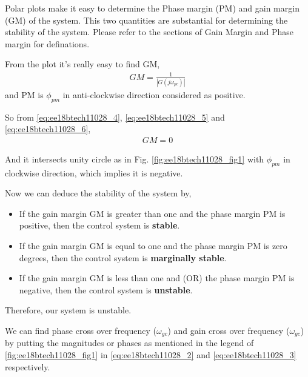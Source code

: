 \begin{enumerate}[label=\thesection.\arabic*.,ref=\thesection.\theenumi]
Polar plots make it easy to determine the Phase margin (PM) and gain margin (GM) of the system.
This two quantities are substantial for determining the stability of the system.
Please refer to the sections of Gain Margin and Phase margin for definations.




From the plot it's really easy to find GM,
\begin{align}
    GM = \frac{1}{|G(j\omega_{pc})|}
    \label{eq:ee18btech11028_6}
\end{align}
and PM is $\phi_{pm}$ in anti-clockwise direction considered as positive.

So from \eqref{eq:ee18btech11028_4}, \eqref{eq:ee18btech11028_5} and \eqref{eq:ee18btech11028_6},
\begin{align}
    GM = 0
\end{align}

And it intersects unity circle as in Fig. \ref{fig:ee18btech11028_fig1} with $\phi_{pm}$ in clockwise direction, which implies it is negative.

Now we can deduce the stability of the system by,
\begin{itemize}
    \item If the gain margin GM is greater than one and the phase margin PM is positive, then the control system is \textbf{stable}.
    \item If the gain margin GM is equal to one and the phase margin PM is zero degrees, then the control system is  \textbf{marginally stable}.
    \item If the gain margin GM is less than one and (OR) the phase margin PM is negative, then the control system is \textbf{unstable}.
\end{itemize}

Therefore, our system is unstable.

We can find phase cross over frequency ($\omega_{gc}$) and gain cross over frequency ($\omega_{gc}$) by putting the magnitudes or phases as mentioned in the legend of \ref{fig:ee18btech11028_fig1} in \eqref{eq:ee18btech11028_2}
and \eqref{eq:ee18btech11028_3} respectively.


\end{enumerate}
